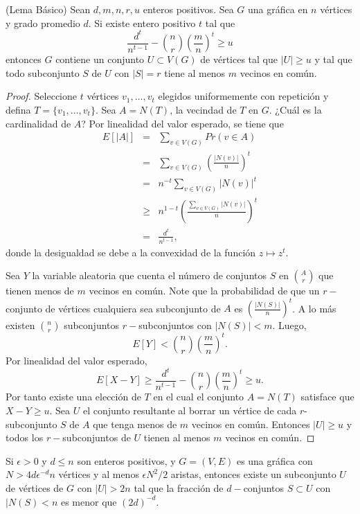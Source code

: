 \begin{theorem}(Lema Básico)\label{drc}
Sean $d, m, n, r, u$ enteros positivos. Sea $G$ una gráfica en
$n$ vértices y grado promedio $d$. Si existe
entero positivo $t$
tal que
$$\frac{d^t}{n^{t-1}} - \binom{n}{r} \left(\frac{m}{n}\right)^t \geq u$$
entonces $G$ contiene un conjunto $U \subset V(G)$ de vértices tal que
$\vert U \vert \geq u$ y tal que todo subconjunto $S$ de $U$ con
$\vert S \vert = r$
tiene al menos $m$ vecinos en común.
\end{theorem}
\begin{proof}
Seleccione $t$ vértices $v_1, \ldots, v_t$ elegidos uniformemente
con repetición y defina $T = \{v_1, \ldots, v_t\}$. Sea $A = N(T)$,
la vecindad de $T$ en $G$. ¿Cuál es la cardinalidad de $A$? Por
linealidad del valor esperado, se tiene que
\begin{eqnarray*}
  E[\vert A \vert] &=& \sum_{v \in V(G)} Pr(v \in A)\\
  &=& \sum_{v \in V(G)} \left(\frac{\vert N(v) \vert}{n} \right)^t\\
  &=& n^{-t} \sum_{v \in V(G)} \vert N(v) \vert^t \\
  &\ge& n^{1-t}\left( \frac{\sum_{v \in V(G)} \vert N(v) \vert}{n} \right)^t\\
  &=& \frac{d^t}{n^{t-1}},
\end{eqnarray*}
donde la desigualdad se debe a la convexidad de la función $z \mapsto z^t$.

Sea $Y$ la variable aleatoria que cuenta
el número de conjuntos $S$ en $\binom{A}{r}$ que tienen menos de
$m$ vecinos en común. Note que la probabilidad de que un
$r-$conjunto de vértices cualquiera sea subconjunto de $A$ es
$\left( \frac{\vert N(S) \vert}{n}\right)^t$. A lo más existen
$\binom{n}{r}$ subconjuntos $r-$subconjuntos con $\vert N(S)\vert < m$. Luego,
$$ E[Y] < \binom{n}{r}\left(\frac{m}{n}\right)^t. $$
Por linealidad del valor esperado,
$$E[X - Y] \geq \frac{d^t}{n^{t-1}} - \binom{n}{r}\left(\frac{m}{n}
\right)^t  \ge u.$$
Por tanto existe una elección de $T$ en el cual el conjunto $A =
N(T)$ satisface que $X - Y \ge u$.
Sea $U$ el conjunto resultante al borrar un vértice de cada
$r$-subconjunto $S$ de $A$ que tenga menos de $m$ vecinos en común.
Entonces $\vert U \vert \ge u$ y todos los $r-$subconjuntos de $U$
tienen al menos $m$ vecinos en común.
\end{proof}

\begin{theorem}
Si $\epsilon > 0$ y $d\leq n$ son enteros positivos, y $G = (V, E)$
es una gráfica con
$N > 4d\epsilon^{-d}n$ vértices y al menos $\epsilon N^2 / 2$
aristas, entonces existe un
subconjunto $U$ de vértices de $G$ con $\vert U \vert > 2n$ tal que
la fracción de $d-$conjuntos $S \subset U$ con $\vert N(S) < n$ es
menor que $(2d)^{-d}$.
\end{theorem}
